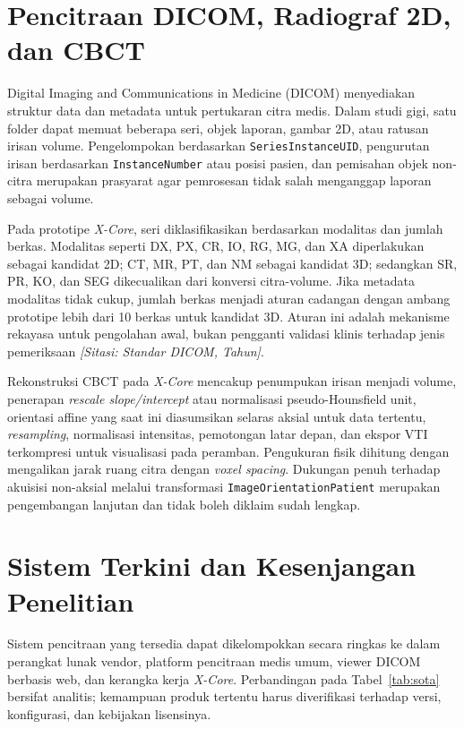\documentclass[12pt,a4paper,oneside]{report}
\newcommand{\sitasi}[1]{\textit{[Sitasi: #1]}}
\newcommand{\xcore}{\textit{X-Core}}
\begin{document}
\section{Pencitraan DICOM, Radiograf 2D, dan CBCT}

Digital Imaging and Communications in Medicine (DICOM) menyediakan struktur data dan metadata untuk pertukaran citra medis. Dalam studi gigi, satu folder dapat memuat beberapa seri, objek laporan, gambar 2D, atau ratusan irisan volume. Pengelompokan berdasarkan \texttt{SeriesInstanceUID}, pengurutan irisan berdasarkan \texttt{InstanceNumber} atau posisi pasien, dan pemisahan objek non-citra merupakan prasyarat agar pemrosesan tidak salah menganggap laporan sebagai volume.

Pada prototipe \xcore{}, seri diklasifikasikan berdasarkan modalitas dan jumlah berkas. Modalitas seperti DX, PX, CR, IO, RG, MG, dan XA diperlakukan sebagai kandidat 2D; CT, MR, PT, dan NM sebagai kandidat 3D; sedangkan SR, PR, KO, dan SEG dikecualikan dari konversi citra-volume. Jika metadata modalitas tidak cukup, jumlah berkas menjadi aturan cadangan dengan ambang prototipe lebih dari 10 berkas untuk kandidat 3D. Aturan ini adalah mekanisme rekayasa untuk pengolahan awal, bukan pengganti validasi klinis terhadap jenis pemeriksaan \sitasi{Standar DICOM, Tahun}.

Rekonstruksi CBCT pada \xcore{} mencakup penumpukan irisan menjadi volume, penerapan \textit{rescale slope/intercept} atau normalisasi pseudo-Hounsfield unit, orientasi affine yang saat ini diasumsikan selaras aksial untuk data tertentu, \textit{resampling}, normalisasi intensitas, pemotongan latar depan, dan ekspor VTI terkompresi untuk visualisasi pada peramban. Pengukuran fisik dihitung dengan mengalikan jarak ruang citra dengan \textit{voxel spacing}. Dukungan penuh terhadap akuisisi non-aksial melalui transformasi \texttt{ImageOrientationPatient} merupakan pengembangan lanjutan dan tidak boleh diklaim sudah lengkap.

\section{Sistem Terkini dan Kesenjangan Penelitian}

Sistem pencitraan yang tersedia dapat dikelompokkan secara ringkas ke dalam perangkat lunak vendor, platform pencitraan medis umum, viewer DICOM berbasis web, dan kerangka kerja \xcore{}. Perbandingan pada Tabel~\ref{tab:sota} bersifat analitis; kemampuan produk tertentu harus diverifikasi terhadap versi, konfigurasi, dan kebijakan lisensinya.
\end{document}
